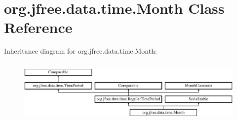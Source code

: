 \hypertarget{classorg_1_1jfree_1_1data_1_1time_1_1_month}{}\section{org.\+jfree.\+data.\+time.\+Month Class Reference}
\label{classorg_1_1jfree_1_1data_1_1time_1_1_month}
Inheritance diagram for org.\+jfree.\+data.\+time.\+Month\+:\begin{figure}[H]
\begin{center}
\leavevmode
\includegraphics[height=3.190883cm]{classorg_1_1jfree_1_1data_1_1time_1_1_month}
\end{center}
\end{figure}
